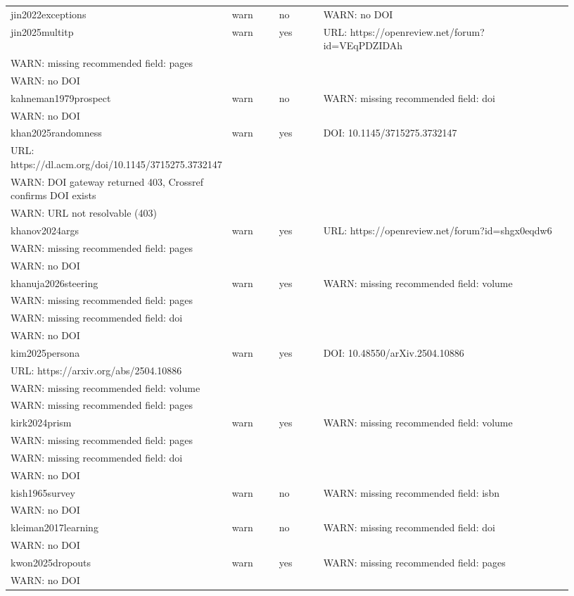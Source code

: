 \documentclass[11pt]{article}
\begin{document}
\begin{longtable}{p{0.18\linewidth}p{0.1\linewidth}p{0.1\linewidth}p{0.55\linewidth}}
jin2022exceptions & warn & no & WARN: no DOI \\
jin2025multitp & warn & yes & URL: https://openreview.net/forum?id=VEqPDZIDAh \\ WARN: missing recommended field: pages \\ WARN: no DOI \\
kahneman1979prospect & warn & no & WARN: missing recommended field: doi \\ WARN: no DOI \\
khan2025randomness & warn & yes & DOI: 10.1145/3715275.3732147 \\ URL: https://dl.acm.org/doi/10.1145/3715275.3732147 \\ WARN: DOI gateway returned 403, Crossref confirms DOI exists \\ WARN: URL not resolvable (403) \\
khanov2024args & warn & yes & URL: https://openreview.net/forum?id=shgx0eqdw6 \\ WARN: missing recommended field: pages \\ WARN: no DOI \\
khanuja2026steering & warn & yes & WARN: missing recommended field: volume \\ WARN: missing recommended field: pages \\ WARN: missing recommended field: doi \\ WARN: no DOI \\
kim2025persona & warn & yes & DOI: 10.48550/arXiv.2504.10886 \\ URL: https://arxiv.org/abs/2504.10886 \\ WARN: missing recommended field: volume \\ WARN: missing recommended field: pages \\
kirk2024prism & warn & yes & WARN: missing recommended field: volume \\ WARN: missing recommended field: pages \\ WARN: missing recommended field: doi \\ WARN: no DOI \\
kish1965survey & warn & no & WARN: missing recommended field: isbn \\ WARN: no DOI \\
kleiman2017learning & warn & no & WARN: missing recommended field: doi \\ WARN: no DOI \\
kwon2025dropouts & warn & yes & WARN: missing recommended field: pages \\ WARN: no DOI \\

\end{longtable}
\end{document}
